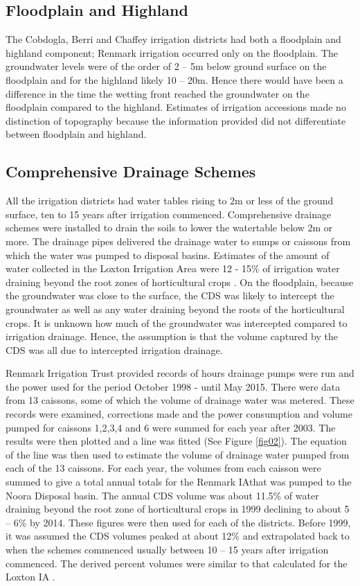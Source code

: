 \documentclass[a4paper, titlepage, 12pt]{article}\usepackage[]{graphicx}\usepackage[]{color}
\begin{document}
\begin{sffamily}
\subsection{Floodplain and Highland} The Cobdogla, Berri and Chaffey irrigation districts had both a floodplain and highland component; Renmark irrigation occurred only on the floodplain. The groundwater levels were of the order of 2 -- 5m below ground surface on the floodplain and for the highland likely 10 -- 20m. Hence there would have been a difference in the time the wetting front reached the groundwater on the floodplain compared to the highland. Estimates of irrigation accessions made no distinction of topography because the information provided did not differentiate between floodplain and highland.

\subsection{Comprehensive Drainage Schemes} All the irrigation districts had water tables rising to 2m or less of the ground surface, ten to 15 years after irrigation commenced. Comprehensive drainage schemes were installed to drain the soils to lower the watertable below 2m or more. The drainage pipes delivered the drainage water to sumps or caissons from which the water was pumped to disposal basins. Estimates of the amount of water collected in the Loxton Irrigation Area were 12 - 15\% of irrigation water draining beyond the root zones of horticultural crops \citep{Meissner2011a}. On the floodplain, because the groundwater was close to the surface, the CDS was likely to intercept the groundwater as well as any water draining beyond the roots of the horticultural crops. It is unknown how much of the groundwater was intercepted compared to irrigation drainage. Hence, the assumption is that the volume captured by the CDS was all due to intercepted irrigation drainage.

Renmark Irrigation Trust provided records of hours drainage pumps were run and the power used for the period October 1998 - until May 2015. There were data from 13 caissons, some of which the volume of drainage water was metered. These records were examined, corrections made and the power consumption and volume pumped for caissons 1,2,3,4 and 6 were summed for each year after 2003. The results were then plotted and a line was fitted (See Figure \ref{fig02}). The equation of the line was then used to estimate the volume of drainage water pumped from each of the 13 caissons. For each year, the volumes from each caisson were summed to give a total annual totals for the Renmark IAthat was pumped to the Noora Disposal basin. The annual CDS volume was about 11.5\% of water draining beyond the root zone of horticultural crops in 1999 declining to about 5 -- 6\%  by 2014. These figures were then used for each of the districts. Before 1999, it was assumed the CDS volumes peaked at about 12\% and extrapolated back to when the schemes commenced usually between 10 -- 15 years after irrigation commenced.  The derived percent volumes were similar to that calculated for the Loxton IA \citep{Meissner2011a}.


\end{sffamily}
\end{document}
